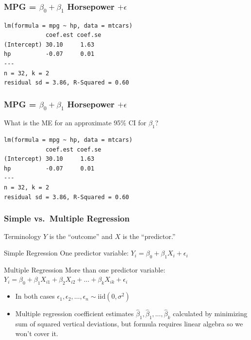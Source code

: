 \documentclass{beamer}
\begin{document}



\begin{frame}[fragile]
\frametitle{MPG = $\beta_0 + \beta_1$ Horsepower $+ \epsilon$}
\footnotesize
\begin{verbatim}
lm(formula = mpg ~ hp, data = mtcars)
            coef.est coef.se
(Intercept) 30.10     1.63  
hp          -0.07     0.01  
---
n = 32, k = 2
residual sd = 3.86, R-Squared = 0.60
\end{verbatim}

\end{frame}
\begin{frame}[fragile]
\frametitle{MPG = $\beta_0 + \beta_1$ Horsepower $+ \epsilon$ }
\alert{What is the ME for an approximate 95\% CI for $\beta_1$?}
\footnotesize
\begin{verbatim}
lm(formula = mpg ~ hp, data = mtcars)
            coef.est coef.se
(Intercept) 30.10     1.63  
hp          -0.07     0.01  
---
n = 32, k = 2
residual sd = 3.86, R-Squared = 0.60
\end{verbatim}
\end{frame}

\begin{frame}
\frametitle{Simple vs.\ Multiple Regression}
\begin{block}{Terminology}
$Y$ is the ``outcome'' and $X$ is the ``predictor.''
\end{block}

\begin{block}{Simple Regression}
One predictor variable: $Y_i = \beta_0 + \beta_1 X_i + \epsilon_i$
\end{block}
\begin{block}{Multiple Regression}
More than one predictor variable: $Y_i = \beta_0 + \beta_1 X_{i1} + \beta_2 X_{i2} +  \hdots + \beta_k X_{ik} + \epsilon_i$
\end{block}


\begin{itemize}
	\item In both cases $\epsilon_1, \epsilon_2, \hdots, \epsilon_n \sim \mbox{iid} (0,\sigma^2)$
	\item Multiple regression coefficient estimates $\widehat{\beta}_1, \widehat{\beta}_1, \hdots, \widehat{\beta}_k$ calculated by minimizing  sum of squared vertical deviations, but formula requires linear algebra so we won't cover it.
\end{itemize}
\end{frame}
\end{document}
